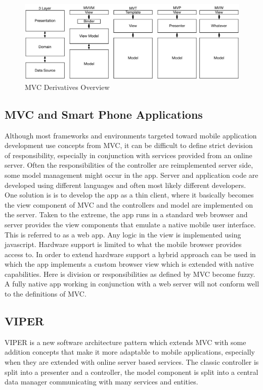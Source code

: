 \begin{figure}[H]
    \centering
    \includegraphics[height=4cm,keepaspectratio]{assets/concept/mvc_3.pdf}
    \caption{MVC Derivatives Overview}
    \label{fig:mvc_alt}
\end{figure}

\subsection{MVC and Smart Phone Applications}

Although most frameworks and environments targeted toward mobile application development use concepts from MVC, it can be difficult to define strict devision of responsibility, especially in conjunction with services provided from an online server. Often the responsibilities of the controller are reimplemented server side, some model management might occur in the app. Server and application code are developed using different languages and often most likely different developers. One solution is is to develop the app as a thin client, where it basically becomes the view component of MVC and the controllers and model are implemented on the server. Taken to the extreme, the app runs in a standard web browser and server provides the view components that emulate a native mobile user interface. This is referred to as a web app. Any logic in the view is implemented using javascript. Hardware support is limited to what the mobile browser provides access to. In order to extend hardware support a hybrid approach can be used in which the app implements a custom browser view which is extended with native capabilities. Here is division or responsibilities as defined by MVC become fuzzy. A fully native app working in conjunction with a web server will not conform well to the definitions of MVC.

\subsection{VIPER}

VIPER is a new software architecture pattern which extends MVC with some addition concepts that make it more adaptable to mobile applications, especially when they are extended with online server based services. The classic controller is split into a presenter and a controller, the model component is split into a central data manager communicating with many services and entities\cite{viper}.

